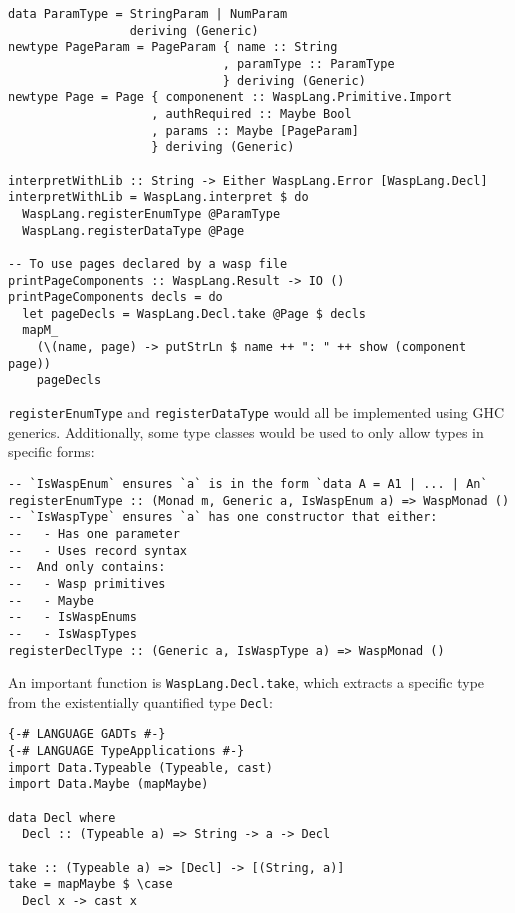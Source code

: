 \begin{minipage}{\linewidth}
\begin{lstlisting}
data ParamType = StringParam | NumParam
                 deriving (Generic)
newtype PageParam = PageParam { name :: String
                              , paramType :: ParamType
                              } deriving (Generic)
newtype Page = Page { componenent :: WaspLang.Primitive.Import
                    , authRequired :: Maybe Bool
                    , params :: Maybe [PageParam]
                    } deriving (Generic)

interpretWithLib :: String -> Either WaspLang.Error [WaspLang.Decl]
interpretWithLib = WaspLang.interpret $ do
  WaspLang.registerEnumType @ParamType
  WaspLang.registerDataType @Page

-- To use pages declared by a wasp file
printPageComponents :: WaspLang.Result -> IO ()
printPageComponents decls = do
  let pageDecls = WaspLang.Decl.take @Page $ decls
  mapM_
    (\(name, page) -> putStrLn $ name ++ ": " ++ show (component page))
    pageDecls
\end{lstlisting}
\end{minipage}

\texttt{registerEnumType} and \texttt{registerDataType} would all be
implemented using GHC generics. Additionally, some type classes would be used
to only allow types in specific forms:

\begin{minipage}{\linewidth}
\begin{lstlisting}
-- `IsWaspEnum` ensures `a` is in the form `data A = A1 | ... | An`
registerEnumType :: (Monad m, Generic a, IsWaspEnum a) => WaspMonad ()
-- `IsWaspType` ensures `a` has one constructor that either:
--   - Has one parameter
--   - Uses record syntax
--  And only contains:
--   - Wasp primitives
--   - Maybe
--   - IsWaspEnums
--   - IsWaspTypes
registerDeclType :: (Generic a, IsWaspType a) => WaspMonad ()
\end{lstlisting}
\end{minipage}

An important function is \texttt{WaspLang.Decl.take}, which extracts a specific
type from the existentially quantified type \texttt{Decl}:

\begin{minipage}{\linewidth}
\begin{lstlisting}
{-# LANGUAGE GADTs #-}
{-# LANGUAGE TypeApplications #-}
import Data.Typeable (Typeable, cast)
import Data.Maybe (mapMaybe)

data Decl where
  Decl :: (Typeable a) => String -> a -> Decl

take :: (Typeable a) => [Decl] -> [(String, a)]
take = mapMaybe $ \case
  Decl x -> cast x
\end{lstlisting}
\end{minipage}

